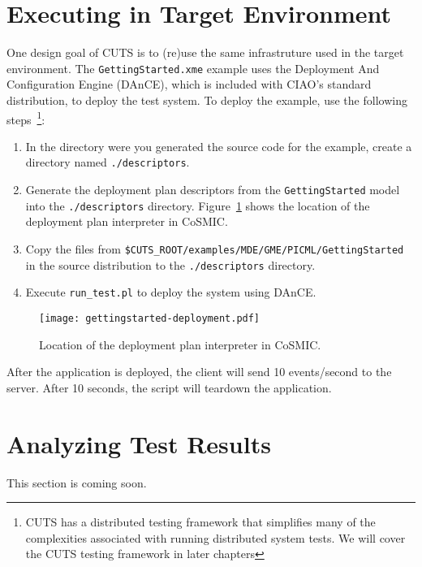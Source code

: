 \section{Executing in Target Environment}
\label{sec:quickstart-execution}

One design goal of CUTS is to (re)use the same infrastruture used in the 
target environment. The \texttt{GettingStarted.xme} example uses the Deployment 
And Configuration Engine (DAnCE), which is included with CIAO's standard 
distribution, to deploy the test system. To deploy the example, use the 
following steps~\footnote{CUTS has a distributed testing framework that 
simplifies many of the complexities associated with running distributed 
system tests. We will cover the CUTS testing framework in later chapters}:
\begin{enumerate}
  \item In the directory were you generated the source code for 
  the example, create a directory named \texttt{./descriptors}.
  
  \item Generate the deployment plan descriptors from the \texttt{GettingStarted}  
  model into the \texttt{./descriptors} directory. 
  Figure~\ref{fig:gettingstarted-deployment} shows the 
  location of the deployment plan interpreter in CoSMIC.
  
  \item Copy the files from \texttt{\$CUTS\_ROOT/examples/MDE/GME/PICML/GettingStarted}
  in the source distribution to the \texttt{./descriptors} directory.
   
  \item Execute \texttt{run\_test.pl} to deploy the system using 
  DAnCE.
\end{enumerate}
\begin{figure}[htbp]
  \centering
  \texttt{[image: gettingstarted-deployment.pdf]}
  \caption{Location of the deployment plan interpreter in CoSMIC.}
  \label{fig:gettingstarted-deployment}
\end{figure}
  
After the application is deployed, the client will send 10 events/second
to the server. After 10 seconds, the script will teardown the application.

\section{Analyzing Test Results}
\label{sec:quickstart-analysis}

This section is coming soon.


